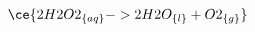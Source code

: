 \documentclass[../main.tex]{subfiles}%
\begin{document}
%
    \Xequation%
    \begin{equation}%
        \ce{2H2O2_{\{aq\}} -> 2H2O_{\{l\}} + O2_{\{g\}}}%
        \label{eq:copper-etch-4}%
    \end{equation}%
\end{document}
